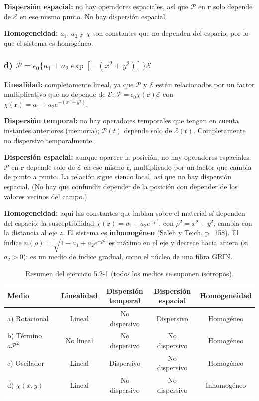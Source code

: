 \documentclass{article}
\newcommand{\Ec}{\boldsymbol{\mathcal{E}}}
\newcommand{\Pc}{\boldsymbol{\mathcal{P}}}
\begin{document}
\textbf{Dispersión espacial:} no hay operadores espaciales, así que $\Pc$ en $\mathbf r$ solo depende de
$\Ec$ en ese mismo punto. No hay dispersión espacial.

\textbf{Homogeneidad:} $a_1$, $a_2$ y $\chi$ son constantes que no dependen del espacio, por lo que el
sistema es homogéneo.

\subsubsection*{d) $\Pc=\epsilon_0\{a_1+a_2\exp[-(x^2+y^2)]\}\Ec$}

\textbf{Linealidad:} completamente lineal, ya que $\Pc$ y $\Ec$ están relacionados por un factor
multiplicativo que no depende de $\Ec$: $\Pc=\epsilon_0\chi(\mathbf r)\Ec$ con
$\chi(\mathbf r)=a_1+a_2e^{-(x^2+y^2)}$.

\textbf{Dispersión temporal:} no hay operadores temporales que tengan en cuenta instantes anteriores
(memoria); $\Pc(t)$ depende solo de $\Ec(t)$. Completamente no dispersivo temporalmente.

\textbf{Dispersión espacial:} aunque aparece la posición, no hay operadores espaciales: $\Pc$ en
$\mathbf r$ depende solo de $\Ec$ en ese mismo $\mathbf r$, multiplicado por un factor que cambia de
punto a punto. La relación sigue siendo local, así que no hay dispersión espacial. (No hay que
confundir depender de la posición con depender de los valores vecinos del campo.)

\textbf{Homogeneidad:} aquí las constantes que hablan sobre el material sí dependen del espacio: la
susceptibilidad $\chi(\mathbf r)=a_1+a_2e^{-\rho^2}$, con $\rho^2=x^2+y^2$, cambia con la distancia al
eje $z$. El sistema es \textbf{inhomogéneo} (Saleh y Teich, p.~158). El índice
$n(\rho)=\sqrt{1+a_1+a_2e^{-\rho^2}}$ es máximo en el eje y decrece hacia afuera (si $a_2>0$): es un medio
de índice gradual, como el núcleo de una fibra GRIN.

\begin{table}[H]
\centering
\caption{Resumen del ejercicio 5.2-1 (todos los medios se suponen isótropos).}
\small
\begin{tabular}{@{}lcccc@{}}
\toprule
Medio & Linealidad & \shortstack{Dispersión\\temporal} & \shortstack{Dispersión\\espacial} & Homogeneidad \\
\midrule
a) Rotacional & Lineal & No dispersivo & Dispersivo & Homogéneo \\
b) Término $a\mathcal P^2$ & No lineal & No dispersivo & No dispersivo & Homogéneo \\
c) Oscilador & Lineal & Dispersivo & No dispersivo & Homogéneo \\
d) $\chi(x,y)$ & Lineal & No dispersivo & No dispersivo & Inhomogéneo \\
\bottomrule
\end{tabular}
\end{table}
\end{document}
